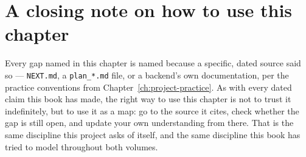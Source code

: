 \section{A closing note on how to use this chapter}

Every gap named in this chapter is named because a specific, dated source said so ---
\texttt{NEXT.md}, a \texttt{plan\_*.md} file, or a backend's own documentation, per the
practice conventions from Chapter~\ref{ch:project-practice}. As with every dated claim this
book has made, the right way to use this chapter is not to trust it indefinitely, but to use
it as a map: go to the source it cites, check whether the gap is still open, and update your
own understanding from there. That is the same discipline this project asks of itself, and
the same discipline this book has tried to model throughout both volumes.
